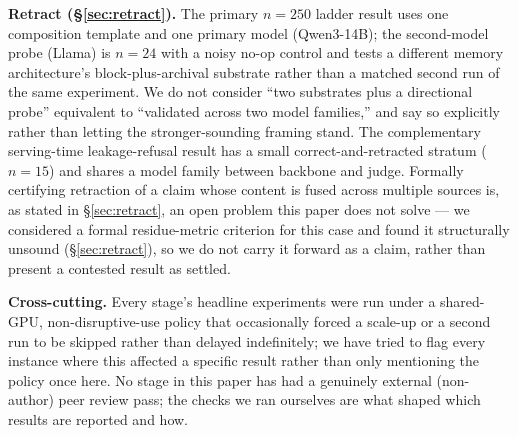 \textbf{Retract (\S\ref{sec:retract}).} The primary $n{=}250$ ladder result uses one composition template and one primary model (Qwen3-14B); the second-model probe (Llama) is $n{=}24$ with a noisy no-op control and tests a different memory architecture's block-plus-archival substrate rather than a matched second run of the same experiment. We do not consider ``two substrates plus a directional probe'' equivalent to ``validated across two model families,'' and say so explicitly rather than letting the stronger-sounding framing stand. The complementary serving-time leakage-refusal result has a small correct-and-retracted stratum ($n{=}15$) and shares a model family between backbone and judge. Formally certifying retraction of a claim whose content is fused across multiple sources is, as stated in \S\ref{sec:retract}, an open problem this paper does not solve --- we considered a formal residue-metric criterion for this case and found it structurally unsound (\S\ref{sec:retract}), so we do not carry it forward as a claim, rather than present a contested result as settled.

\textbf{Cross-cutting.} Every stage's headline experiments were run under a shared-GPU, non-disruptive-use policy that occasionally forced a scale-up or a second run to be skipped rather than delayed indefinitely; we have tried to flag every instance where this affected a specific result rather than only mentioning the policy once here. No stage in this paper has had a genuinely external (non-author) peer review pass; the checks we ran ourselves are what shaped which results are reported and how.
